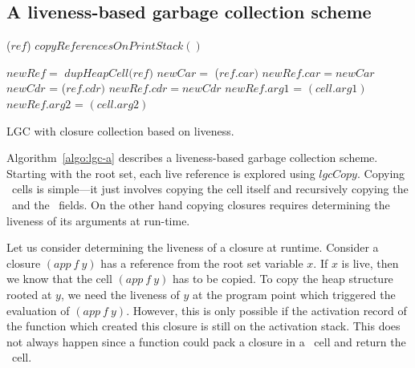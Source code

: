 \documentclass[9pt]{sigplanconf}
\begin{document}
\subsection{A liveness-based garbage collection scheme}
\label{sec:live-clo}
  \SetStartEndCondition{ }{}{}%
  \AlgoDontDisplayBlockMarkers\SetAlgoNoEnd\SetAlgoNoLine%

\begin{algorithm}[t]
  \Fn{\Lgc{}}
     {
            {\Copy($\mathit{ref}$)\;}
            $\mathit{copyReferencesOnPrintStack()}$\;  
     }
     
        {
             {
               $\mathit{newRef} = $  $\mathit{dupHeapCell(ref})$\;
                  {
                    {
                      $\mathit{newCar}  = $  \Copy($\mathit{ref\!.car})$\;
                      $\mathit{newRef.car}   =  newCar$\;
                    }
                    {
                      $\mathit{newCdr}$ =   \Copy($\mathit{ref.cdr})$\;
                      $\mathit{newRef.cdr}   = \mathit{newCdr}$\;
                    }    
                  }
                   {
                     $\mathit{newRef.arg1}$ =  \Copy$\mathit{(cell.arg1)}$\;
                     $\mathit{newRef.arg2}$ =  \Copy$\mathit{(cell.arg2)}$\;
                   }
             }
        }

        \caption{LGC with closure collection based on liveness.\label{algo:lgc-a}}
\end{algorithm}
Algorithm~\ref{algo:lgc-a}   describes    a   liveness-based   garbage
collection scheme.  Starting with the root set, each live reference is
explored  using   $\mathit{  lgcCopy}$.    Copying  \CONS\   cells  is
simple---it  just involves  copying  the cell  itself and  recursively
copying the  \CAR\ and the  \CDR\ fields.   On the other  hand copying
closures  requires  determining  the  liveness  of  its  arguments  at
run-time.

Let   us  consider   determining  the   liveness  of   a  closure   at
runtime. Consider a closure $(app~f~y)$  has a reference from the root
set  variable  $x$.  If $x$  is  live,  then  we  know that  the  cell
$(app~f~y)$ has  to be copied.  To copy  the heap structure  rooted at
$y$, we need the liveness of  $y$ at the program point which triggered
the evaluation of  $(app~f~y)$. However, this is only  possible if the
activation record of the function  which created this closure is still
on the activation stack. This does  not always happen since a function
could pack a closure in a \CONS\ cell and return the \CONS\ cell.
\end{document}
